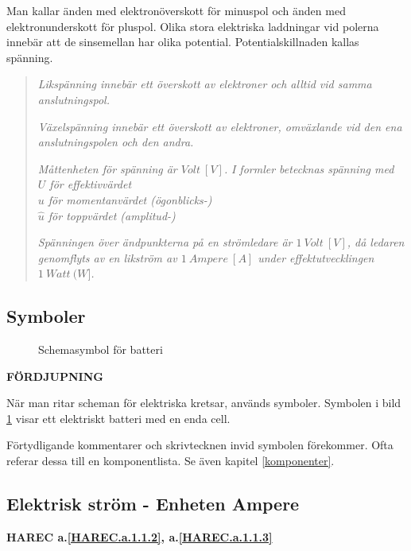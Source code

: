 Man kallar änden med elektronöverskott för minuspol och änden med
elektronunderskott för pluspol. Olika stora elektriska laddningar vid polerna
innebär att de sinsemellan har olika potential. Potentialskillnaden kallas
spänning.

\begin{quote}
\emph{Likspänning innebär ett överskott av elektroner och alltid vid samma
anslutningspol.}

\emph{Växelspänning innebär ett överskott av elektroner, omväxlande vid den ena
anslutningspolen och den andra.}

\emph{Måttenheten för spänning är \(Volt\ [V]\).}
\emph{I formler betecknas spänning med} \\
\emph{\(U\) för effektivvärdet} \\
\emph{\(u\) för momentanvärdet (ögonblicks-)} \\
\emph{\(\hat{u}\) för toppvärdet (amplitud-)}

\emph{Spänningen över ändpunkterna på en strömledare är \(1\ Volt\ [V]\), då ledaren
genomflyts av en likström av \(1\ Ampere\ [A]\) under effektutvecklingen \(1\ Watt\ (W]\).}
\end{quote}

\subsection{Symboler}

\begin{figure}
  \caption{Schemasymbol för batteri}
  \label{fig:bildII2-batteri}
\end{figure}

\textbf{FÖRDJUPNING}

När man ritar scheman för elektriska kretsar, används symboler. Symbolen i
bild \ref{fig:bildII2-batteri} visar ett elektriskt batteri med en enda cell.

Förtydligande kommentarer och skrivtecknen invid symbolen förekommer. Ofta
referar dessa till en komponentlista. Se även kapitel \ref{komponenter}.

\subsection{Elektrisk ström - Enheten Ampere}
\textbf{HAREC a.\ref{HAREC.a.1.1.2}\label{myHAREC.a.1.1.2a}, a.\ref{HAREC.a.1.1.3}\label{myHAREC.a.1.1.3a}}

